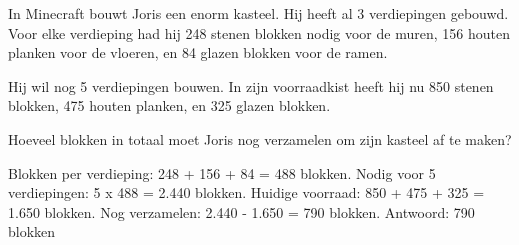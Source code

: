 \begin{opgave}
In Minecraft bouwt Joris een enorm kasteel. Hij heeft al 3 verdiepingen gebouwd. Voor elke verdieping had hij 248 stenen blokken nodig voor de muren, 156 houten planken voor de vloeren, en 84 glazen blokken voor de ramen. 

Hij wil nog 5 verdiepingen bouwen. In zijn voorraadkist heeft hij nu 850 stenen blokken, 475 houten planken, en 325 glazen blokken.

Hoeveel blokken in totaal moet Joris nog verzamelen om zijn kasteel af te maken?
\end{opgave}

\begin{oplossing}
Blokken per verdieping: 248 + 156 + 84 = 488 blokken.
Nodig voor 5 verdiepingen: 5 x 488 = 2.440 blokken.
Huidige voorraad: 850 + 475 + 325 = 1.650 blokken.
Nog verzamelen: 2.440 - 1.650 = 790 blokken.
Antwoord: 790 blokken
\end{oplossing}